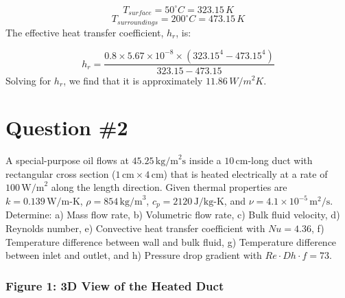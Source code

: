 \documentclass[12pt]{article}
\begin{document}
\[
T_{surface} = 50^\circ C = 323.15 \, K
\]
\[
T_{surroundings} = 200^\circ C = 473.15 \, K
\]
\noindent
The effective heat transfer coefficient, \( h_r \), is:

\[
h_r = \frac{0.8 \times 5.67 \times 10^{-8} \times (323.15^4 - 473.15^4)}{323.15 - 473.15}
\]
\noindent
Solving for \( h_r \), we find that it is approximately \( 11.86 \, W/m^2K \).



\section*{Question \#2}
A special-purpose oil flows at \(45.25 \, \text{kg/m}^2\text{s}\) inside a \(10 \, \text{cm}\)-long duct with rectangular cross section (\(1 \, \text{cm} \times 4 \, \text{cm}\)) that is heated electrically at a rate of \(100 \, \text{W/m}^2\) along the length direction. Given thermal properties are \(k = 0.139 \, \text{W/m-K}\), \(\rho = 854 \, \text{kg/m}^3\), \(c_p = 2120 \, \text{J/kg-K}\), and \(\nu = 4.1 \times 10^{-5} \, \text{m}^2/\text{s}\). Determine:
a) Mass flow rate, 
b) Volumetric flow rate, 
c) Bulk fluid velocity, 
d) Reynolds number, 
e) Convective heat transfer coefficient with \(Nu=4.36\), 
f) Temperature difference between wall and bulk fluid,  
g) Temperature difference between inlet and outlet, and 
h) Pressure drop gradient with \(Re \cdot Dh \cdot f = 73\).
\subsubsection*{Figure 1: 3D View of the Heated Duct}
\begin{center}
\end{center}
\end{document}

